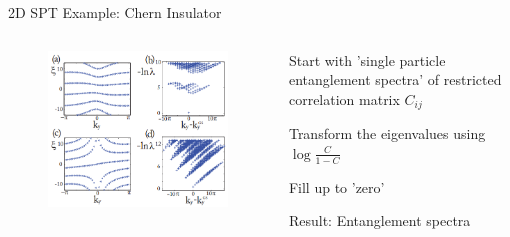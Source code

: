 \begin{frame}{2D SPT Example: Chern Insulator}
\vskip-1.5cm
\begin{columns}[T]
\begin{column}[T]{.7\textwidth}
\begin{figure}
\includegraphics[width=\columnwidth]{diagrams/freefermionEE.png}
\end{figure}
\end{column}
\begin{column}[T]{.3\textwidth}
\bi 
\item Start with 'single particle entanglement spectra' of restricted correlation matrix $C_{ij}$
\item Transform the eigenvalues using $\log{\frac{C}{1-C}}$
\item Fill up to 'zero'
\item Result: Entanglement spectra
\ei
\end{column} 
\end{columns}

\end{frame}